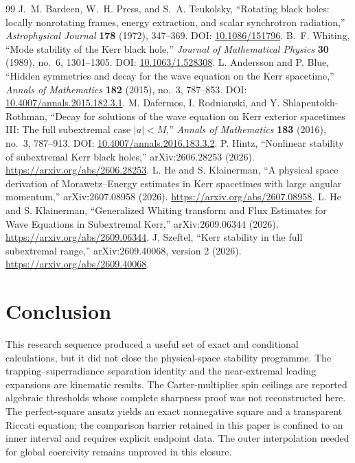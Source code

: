 \documentclass[11pt,a4paper]{article}
\theoremstyle{remark}
\theoremstyle{definition}
\begin{document}
\begin{thebibliography}{99}
 J.~M. Bardeen, W.~H. Press, and S.~A. Teukolsky, ``Rotating black holes: locally nonrotating frames, energy extraction, and scalar synchrotron radiation,'' \emph{Astrophysical Journal} \textbf{178} (1972), 347--369. DOI: \href{https://doi.org/10.1086/151796}{10.1086/151796}.
 B.~F. Whiting, ``Mode stability of the Kerr black hole,'' \emph{Journal of Mathematical Physics} \textbf{30} (1989), no.~6, 1301--1305. DOI: \href{https://doi.org/10.1063/1.528308}{10.1063/1.528308}.
 L. Andersson and P. Blue, ``Hidden symmetries and decay for the wave equation on the Kerr spacetime,'' \emph{Annals of Mathematics} \textbf{182} (2015), no.~3, 787--853. DOI: \href{https://doi.org/10.4007/annals.2015.182.3.1}{10.4007/annals.2015.182.3.1}.
 M. Dafermos, I. Rodnianski, and Y. Shlapentokh-Rothman, ``Decay for solutions of the wave equation on Kerr exterior spacetimes III: The full subextremal case $|a|<M$,'' \emph{Annals of Mathematics} \textbf{183} (2016), no.~3, 787--913. DOI: \href{https://doi.org/10.4007/annals.2016.183.3.2}{10.4007/annals.2016.183.3.2}.
 P. Hintz, ``Nonlinear stability of subextremal Kerr black holes,'' arXiv:2606.28253 (2026). \url{https://arxiv.org/abs/2606.28253}.
 L. He and S. Klainerman, ``A physical space derivation of Morawetz--Energy estimates in Kerr spacetimes with large angular momentum,'' arXiv:2607.08958 (2026). \url{https://arxiv.org/abs/2607.08958}.
 L. He and S. Klainerman, ``Generalized Whiting transform and Flux Estimates for Wave Equations in Subextremal Kerr,'' arXiv:2609.06344 (2026). \url{https://arxiv.org/abs/2609.06344}.
 J. Szeftel, ``Kerr stability in the full subextremal range,'' arXiv:2609.40068, version 2 (2026). \url{https://arxiv.org/abs/2609.40068}.
\end{thebibliography}

\section{Conclusion}
\label{sec:conclusion}

This research sequence produced a useful set of exact and conditional calculations, but it did not close the physical-space stability programme. The trapping--superradiance separation identity and the near-extremal leading expansions are kinematic results. The Carter-multiplier spin ceilings are reported algebraic thresholds whose complete sharpness proof was not reconstructed here. The perfect-square ansatz yields an exact nonnegative square and a transparent Riccati equation; the comparison barrier retained in this paper is confined to an inner interval and requires explicit endpoint data. The outer interpolation needed for global coercivity remains unproved in this closure.
\end{document}
